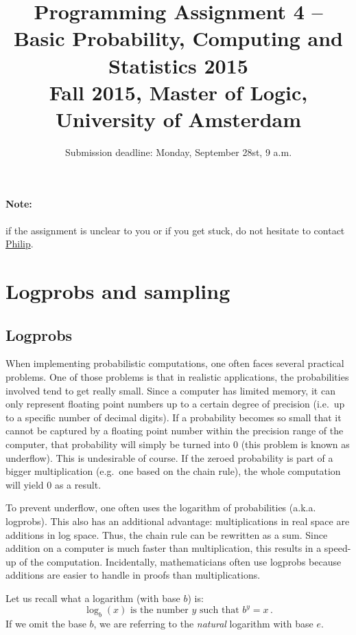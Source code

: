 \documentclass[11pt, leqno, a4paper]{article}
\title{Programming Assignment 4 -- Basic Probability, Computing and Statistics 2015 \\[2mm]
\large{Fall 2015, Master of Logic, University of Amsterdam}}
\author{}
\date{Submission deadline: Monday, September 28st, 9 a.m.}
\begin{document}
\maketitle

\paragraph{Note:} if the assignment is unclear to you or if you get stuck, do not hesitate to contact \href{mailto:P.Schulz@uva.nl}{Philip}.

\section{Logprobs and sampling}

\subsection{Logprobs}
When implementing probabilistic computations, one often faces several practical problems. One of those 
problems is that in realistic applications, the probabilities involved tend to get really small. Since
a computer has limited memory, it can only represent floating point
numbers up to a certain degree of precision
(i.e.\ up to a specific number of decimal digits). If a probability becomes so small that it cannot
be captured by a floating point number within the precision range of the computer, that probability will
simply be turned into 0 (this problem is known as underflow). 
This is undesirable of course. If the zeroed probability is part of a bigger 
multiplication (e.g.\ one based on the chain rule), the whole computation will yield 0 as a result. 

To prevent underflow, one often uses the logarithm of probabilities (a.k.a. logprobs). This also has an
additional advantage: multiplications in real space are additions in log space. Thus, the chain rule
can be rewritten as a sum. Since addition on a computer is much faster than multiplication, this results
in a speed-up of the computation. Incidentally, mathematicians often use logprobs because additions
are easier to handle in proofs than multiplications.

Let us recall what a logarithm (with base $ b $) is:
\begin{equation}
\log_{b}(x) \mbox{ is the number $y$ such that } b^{y} = x \, .
\end{equation}
If we omit the base $b$, we are referring to the \emph{natural}
logarithm with base $e$.
\end{document}

